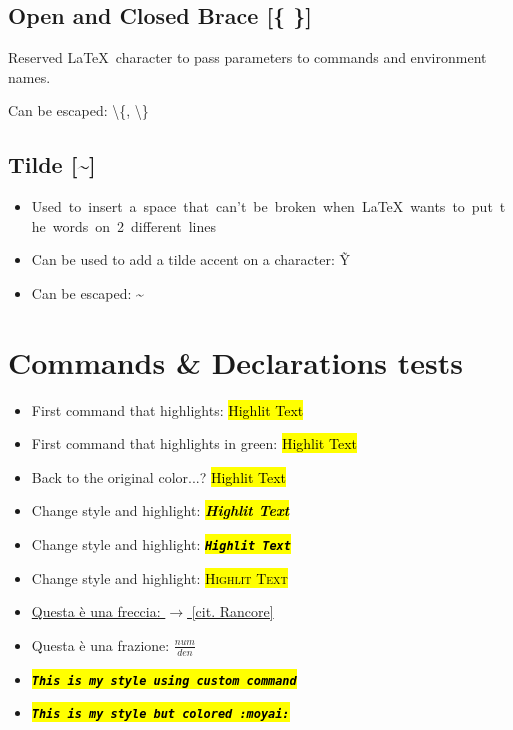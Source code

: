 \documentclass[a4paper]{article}
\newcommand{\mystyle}[1]{\hl{\textit{\textbf{\texttt{#1}}}}}
\newcommand{\mystylecolor}[2]{\sethlcolor{#1} \hl{\textit{\textbf{\texttt{#2}}}}}
\begin{document}
	\subsection{Open and Closed Brace [\{ \}]}
	Reserved \LaTeX\ character to pass parameters to commands and environment names.

	Can be escaped: \textbackslash\{, \textbackslash\}

	\subsection{Tilde [\~{}]}
	\begin{itemize}
		\item Used~to~insert~a~space~that~can't~be~broken~when~\LaTeX~wants~to~put~the~words~on~2~different~lines
		\item Can be used to add a tilde accent on a character: \~{Y}
		\item Can be escaped: \~{}
	\end{itemize}

	\section{Commands \& Declarations tests}
	\begin{itemize}
		\item First command that highlights: \hl{Highlit Text}
		\item First command that highlights in green: { \hl{Highlit Text}}
		\item Back to the original color...? \hl{Highlit Text}
		\item Change style and highlight: \hl{\textit{\textbf{Highlit Text}}}
		\item Change style and highlight: \hl{\textit{\textbf{\texttt{Highlit Text}}}}
		\item Change style and highlight: \hl{\textsc{Highlit Text}}
		\item \href{https://open.spotify.com/track/4AfmZe8i6uNAR5xTSZxqNn?si=aa3887b5fc244fe9}{Questa è una freccia: $\rightarrow$ [cit. Rancore]}
		\item Questa è una frazione: $\frac{num}{den}$
		\item \mystyle{This is my style using custom command}
		\item \mystylecolor{pink}{This is my style but colored :moyai:}
		
	\end{itemize}

	
\end{document}
